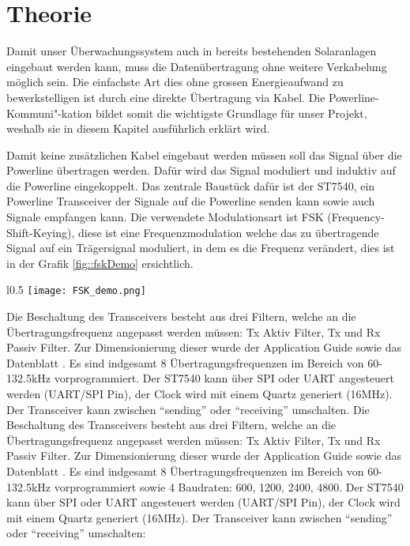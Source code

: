 \section{Theorie}

Damit unser Überwachungssystem auch in bereits bestehenden Solaranlagen eingebaut werden kann, muss die Datenübertragung ohne weitere Verkabelung möglich sein. Die einfachste Art dies ohne grossen Energieaufwand zu bewerkstelligen ist durch eine direkte Übertragung via Kabel. Die Powerline-Kommuni"-kation bildet somit die wichtigste Grundlage für unser Projekt, weshalb sie in diesem Kapitel ausführlich erklärt wird. 


Damit keine zusätzlichen Kabel eingebaut werden müssen soll das Signal über die Powerline übertragen werden. Dafür wird das Signal moduliert und induktiv auf die Powerline eingekoppelt. Das zentrale Baustück dafür ist der ST7540, ein Powerline Transceiver der Signale auf die Powerline senden kann sowie auch Signale empfangen kann. Die verwendete Modulationsart ist FSK (Frequency-Shift-Keying), diese ist eine Frequenzmodulation welche das zu übertragende Signal auf ein Trägersignal moduliert, in dem es die Frequenz verändert, dies ist in der Grafik \ref{fig::fskDemo} ersichtlich.


\begin{wrapfigure}{l}{0.5\textwidth}
\centering
\texttt{[image: FSK\_demo.png]}%
\caption{Prinzip der FSK Modulation \cite{fskDemo_wiki} }
\label{fig::fskDemo}
\end{wrapfigure}

Die Beschaltung des Transceivers besteht aus drei Filtern, welche an die Übertragungsfrequenz angepasst werden müssen: Tx Aktiv Filter, Tx und Rx Passiv Filter. Zur Dimensionierung dieser wurde der Application Guide \cite{Applic_Guide_ST7540} sowie das Datenblatt \cite{Datasheet_ST7540}. Es sind indgesamt 8 Übertragungsfrequenzen im Bereich von 60-132.5kHz vorprogrammiert. Der ST7540 kann über SPI oder UART angesteuert werden (UART/SPI Pin), der Clock wird mit einem Quartz generiert (16MHz). Der Transceiver kann zwischen ``sending'' oder ``receiving'' umschalten.
Die Beschaltung des Transceivers besteht aus drei Filtern, welche an die Übertragungsfrequenz angepasst werden müssen: Tx Aktiv Filter, Tx und Rx Passiv Filter. Zur Dimensionierung dieser wurde der Application Guide \cite{Applic_Guide_ST7540} sowie das Datenblatt \cite{Datasheet_ST7540}. Es sind indgesamt 8 Übertragungsfrequenzen im Bereich von 60-132.5kHz vorprogrammiert sowie 4 Baudraten: 600, 1200, 2400, 4800. Der ST7540 kann über SPI oder UART angesteuert werden (UART/SPI Pin), der Clock wird mit einem Quartz generiert (16MHz). Der Transceiver kann zwischen ``sending'' oder ``receiving'' umschalten:


